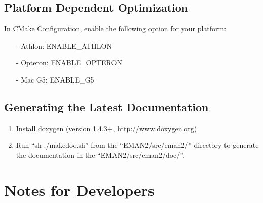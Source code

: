 \subsection{Platform Dependent Optimization}


    In CMake Configuration, enable the following option for your platform:
    \begin{itemize}
        \item[-] Athlon:  ENABLE\_ATHLON
        \item[-] Opteron: ENABLE\_OPTERON
        \item[-] Mac G5:  ENABLE\_G5
    \end{itemize}
          
\subsection{Generating the  Latest Documentation}

  \begin{enumerate}
    \item
      Install doxygen (version 1.4.3+, \href{http://www.doxygen.org}{http://www.doxygen.org})

    \item
      Run ``sh ./makedoc.sh'' from the ``EMAN2/src/eman2/'' directory to
   generate the documentation in the ``EMAN2/src/eman2/doc/''.
  \end{enumerate}


\section{Notes for Developers} 
\label{DEVELOPERS-NOTES} 

